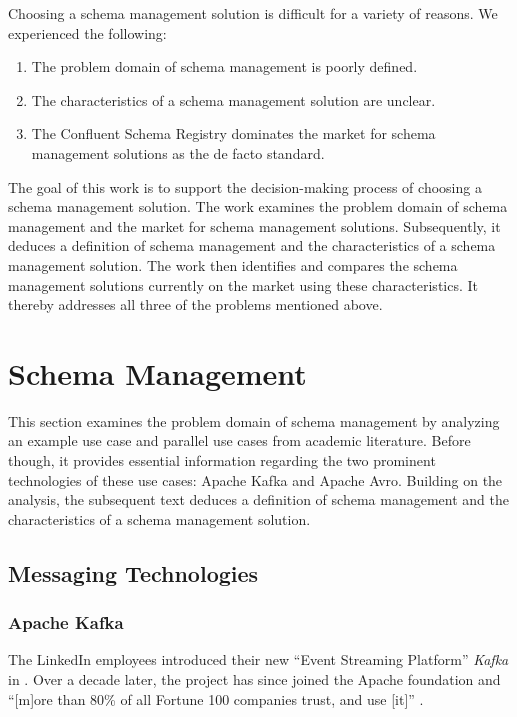 Choosing a schema management solution is difficult for a variety of reasons. We experienced the following:

\begin{enumerate}
  \item The problem domain of schema management is poorly defined.
  \item The characteristics of a schema management solution are unclear.
  \item The Confluent Schema Registry dominates the market for schema management solutions as the de facto standard.
\end{enumerate}

The goal of this work is to support the decision-making process of choosing a schema management solution.
The work examines the problem domain of schema management and the market for schema management solutions.
Subsequently, it deduces a definition of schema management and the characteristics of a schema management solution.
The work then identifies and compares the schema management solutions currently on the market using these characteristics.
It thereby addresses all three of the problems mentioned above.


\section{Schema Management}\label{sec:schema-management}

This section examines the problem domain of schema management by analyzing an example use case and parallel use cases from academic literature.
Before though, it provides essential information regarding the two prominent technologies of these use cases: Apache Kafka and Apache Avro.
Building on the analysis, the subsequent text deduces a definition of schema management and the characteristics of a schema management solution.

\subsection{Messaging Technologies}

\subsubsection{Apache Kafka}

The LinkedIn employees \citeauthor{kreps_kafka_2011} introduced their new \enquote{Event Streaming Platform} \emph{Kafka} in \citeyear{kreps_kafka_2011} \parencite{kreps_kafka_2011}.
Over a decade later, the project has since joined the Apache foundation and \enquote{[m]ore than 80\% of all Fortune 100 companies trust, and use [it]} \parencite{apache_software_foundation_apache_nodate}.

